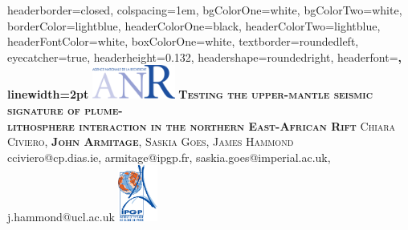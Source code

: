 \documentclass[landscape,a0paper,fontscale=0.285]{baposter} %
\begin{document}
\begin{poster}
{
headerborder=closed, %
colspacing=1em, %
bgColorOne=white, %
bgColorTwo=white, %
borderColor=lightblue, %
headerColorOne=black, %
headerColorTwo=lightblue, %
headerFontColor=white, %
boxColorOne=white, %
textborder=roundedleft, %
eyecatcher=true, %
headerheight=0.132\textheight, %
headershape=roundedright, %
headerfont=\Large\bf\textsc, %
linewidth=2pt %
}
%
{\includegraphics[height=3em]{anr}} %
{\bf\textsc{Testing the upper-mantle seismic signature of plume- \\ \vspace{0.05em} lithosphere interaction in the northern East-African Rift}\vspace{0.2em}} %
{\textsc{ Chiara Civiero, \textbf{John Armitage}, Saskia Goes, James Hammond}  \\ cciviero@cp.dias.ie, armitage@ipgp.fr, saskia.goes@imperial.ac.uk, j.hammond@ucl.ac.uk\vspace{0.3em}} %
{\includegraphics[height=5em]{LogoIPGP}} %



\end{poster}
\end{document}
